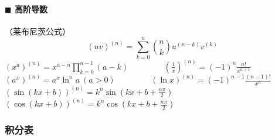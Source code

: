 \paragraph{$\blacksquare$ 高阶导数\\}
（莱布尼茨公式）
$$(uv)^{(n)}=\sum _{{k=0}}^{n}{\binom{n}{k} u^{(n-k)} v^{(k)}}$$
${\displaystyle (x^a)^{(n)}=x^{a-n} \prod _{{k=0}}^{{n-1}} (a-k)}$~~~~~~~~
$(\frac{1}{x})^{(n)}=(-1)^n\frac{n!}{x^{n+1}}$\\
$(a^x)^{(n)}=a^x \ln ^n a~(a>0)$~~~~~~~~
$(\ln x)^{(n)}=(-1)^{n-1} \frac{(n-1)!}{x^n}$\\
$(\sin (kx+b))^{(n)}=k^n \sin (kx+b+\frac{n\pi}{2})$~~~~
$(\cos (kx+b))^{(n)}=k^n \cos (kx+b+\frac{n\pi}{2})$
\subsubsection{积分表}
